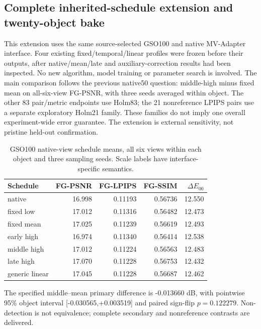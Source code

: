 \documentclass[11pt]{article}
\begin{document}
\subsection*{Complete inherited-schedule extension and twenty-object bake}\label{supp:gso-complete}
This extension uses the same source-selected GSO100 and native MV-Adapter interface. Four existing fixed/temporal/linear profiles were frozen before their outputs, after native/mean/late and auxiliary-correction results had been inspected. No new algorithm, model training or parameter search is involved. The main comparison follows the previous native50 question: middle-high minus fixed mean on all-six-view FG-PSNR, with three seeds averaged within object. The other 83 pair/metric endpoints use Holm83; the 21 nonreference LPIPS pairs use a separate exploratory Holm21 family. These families do not imply one overall experiment-wide error guarantee. The extension is external sensitivity, not pristine held-out confirmation.
\begin{table}[ht]\centering\small\begin{tabular}{lrrrr}\toprule Schedule & FG-PSNR & FG-LPIPS & FG-SSIM & $\Delta E_{00}$ \\\midrule
native & 16.998 & 0.11193 & 0.56736 & 12.550 \\
fixed low & 17.012 & 0.11316 & 0.56482 & 12.473 \\
fixed mean & 17.025 & 0.11239 & 0.56619 & 12.493 \\
early high & 16.974 & 0.11340 & 0.56414 & 12.538 \\
middle high & 17.012 & 0.11224 & 0.56563 & 12.483 \\
late high & 17.070 & 0.11228 & 0.56753 & 12.432 \\
generic linear & 17.045 & 0.11228 & 0.56687 & 12.462 \\
\bottomrule\end{tabular}\caption{GSO100 native-view schedule means, all six views within each object and three sampling seeds. Scale labels have interface-specific semantics.}\end{table}
The specified middle--mean primary difference is -0.013660 dB, with pointwise 95\% object interval [-0.030565,+0.003519] and paired sign-flip $p=0.122279$. Non-detection is not equivalence; complete secondary and nonreference contrasts are delivered.
\end{document}
